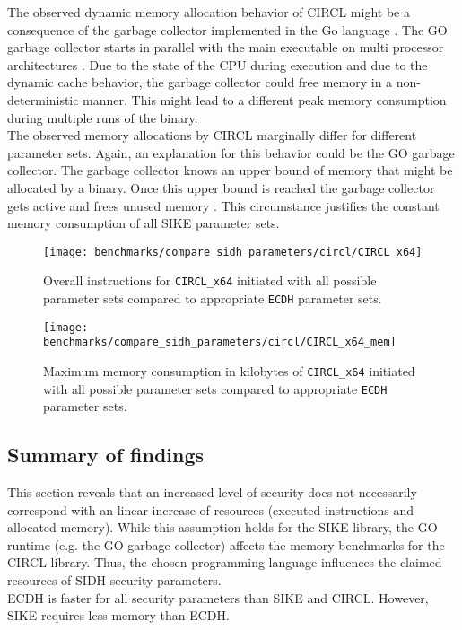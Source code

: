 The observed dynamic memory allocation behavior of \gls{CIRCL} might be a consequence of the garbage collector implemented in the Go language \parencite{Hudson:GGC}. The GO garbage collector starts in parallel with the main executable on multi processor architectures \parencite{go2020faq}. Due to the state of the CPU during execution and due to the dynamic cache behavior, the garbage collector could free memory in a non-deterministic manner. This might lead to a different peak memory consumption during multiple runs of the binary. \\
The observed memory allocations by \gls{CIRCL} marginally differ for different parameter sets. Again, an explanation for this behavior could be the GO garbage collector. The garbage collector knows an upper bound of memory that might be allocated by a binary. Once this upper bound is reached the garbage collector gets active and frees unused memory \parencite{Hudson:GGC}. This circumstance justifies the constant memory consumption of all \gls{SIKE} parameter sets.

\begin{figure}[H]
  \centering
  \texttt{[image: benchmarks/compare\_sidh\_parameters/circl/CIRCL\_x64]}
  \caption[Overall instructions for all parameter sets via \texttt{CIRCL\_x64} compared to \texttt{ECDH}]
  {Overall instructions for \texttt{CIRCL\_x64} initiated with all possible parameter sets compared to appropriate \texttt{ECDH} parameter sets.}
  \label{fig:results_all_curves_circl}
\end{figure}

\begin{figure}[H]
  \centering
  \texttt{[image: benchmarks/compare\_sidh\_parameters/circl/CIRCL\_x64\_mem]}
  \caption[Maximum memory consumption for all parameter sets via \texttt{CIRCL\_x64}  compared to \texttt{ECDH}]
  {Maximum memory consumption in kilobytes of \texttt{CIRCL\_x64} initiated with all possible parameter sets compared to appropriate \texttt{ECDH} parameter sets.}
  \label{fig:results_all_curves_circl_mem}
\end{figure}

\subsection{Summary of findings}\label{sec:findings_sidh_sec_levels}
This section reveals that an increased level of security does not necessarily correspond with an linear increase of resources (executed instructions and allocated memory). While this assumption holds for the \gls{SIKE} library, the GO runtime (e.g. the GO garbage collector) affects the memory benchmarks for the \gls{CIRCL} library. Thus, the chosen programming language influences the claimed resources of \gls{SIDH} security parameters.\\
\gls{ECDH} is faster for all security parameters than \gls{SIKE} and \gls{CIRCL}. However, \gls{SIKE} requires less memory than \gls{ECDH}.

